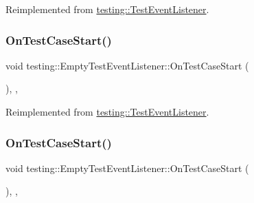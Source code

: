 Reimplemented from \mbox{\hyperlink{classtesting_1_1_test_event_listener_ac48628c9f78d3e10bff77c7366e9e780}{testing\+::\+Test\+Event\+Listener}}.

\mbox{\label{classtesting_1_1_empty_test_event_listener_a7f9a84967fde01000b7a56e9e84b6052}} 
\subsubsection{\texorpdfstring{OnTestCaseStart()}{OnTestCaseStart()}\hspace{0.1cm}{\footnotesize\ttfamily [2/3]}}
{\footnotesize\ttfamily void testing\+::\+Empty\+Test\+Event\+Listener\+::\+On\+Test\+Case\+Start (\begin{DoxyParamCaption}\item[{const \mbox{\hyperlink{classtesting_1_1_test_case}{Test\+Case}} \&}]{ }\end{DoxyParamCaption})\hspace{0.3cm}{\ttfamily [inline]}, {\ttfamily [override]}, {\ttfamily [virtual]}}



Reimplemented from \mbox{\hyperlink{classtesting_1_1_test_event_listener_ac48628c9f78d3e10bff77c7366e9e780}{testing\+::\+Test\+Event\+Listener}}.

\mbox{\label{classtesting_1_1_empty_test_event_listener_a7f9a84967fde01000b7a56e9e84b6052}} 
\subsubsection{\texorpdfstring{OnTestCaseStart()}{OnTestCaseStart()}\hspace{0.1cm}{\footnotesize\ttfamily [3/3]}}
{\footnotesize\ttfamily void testing\+::\+Empty\+Test\+Event\+Listener\+::\+On\+Test\+Case\+Start (\begin{DoxyParamCaption}\item[{const \mbox{\hyperlink{classtesting_1_1_test_case}{Test\+Case}} \&}]{ }\end{DoxyParamCaption})\hspace{0.3cm}{\ttfamily [inline]}, {\ttfamily [override]}, {\ttfamily [virtual]}}



